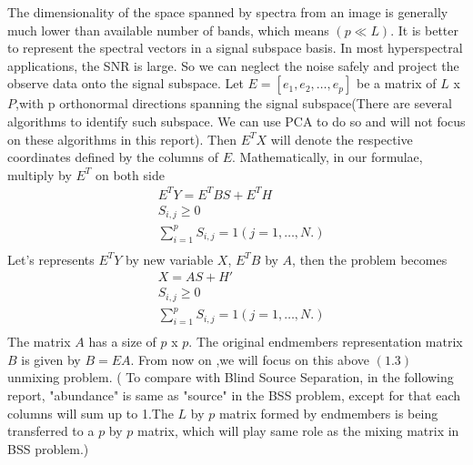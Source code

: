 \documentclass[14pt]{book}
\begin{document}
 The dimensionality of the space spanned by spectra from an image is generally much lower than available number of bands, which means $(p\ll L)$. It is better to represent the spectral vectors in a signal subspace basis. In most hyperspectral applications, the SNR is large. So we can neglect the noise safely and project the observe data onto the signal subspace. Let $E = [e_1,e_2, \dots, e_p]$ be a matrix of $L$ x $P$,with p orthonormal directions spanning the signal subspace(There are several algorithms to identify such subspace. We can use PCA to do so and will not focus on these algorithms in this report). Then $E^TX $ will denote the respective coordinates defined by the columns of $E$. Mathematically, in our formulae, multiply by $E^T$ on both side
\begin{equation}
\begin{aligned}
& E^TY = E^TBS+E^TH\\
& S_{i,j}\geq 0\\
& \sum_{i=1}^p S_{i,j} =1 (j=1, \ldots, N.)\\
\end{aligned}
\end{equation}
Let's represents $E^TY$ by new variable  $X$, $E^TB$ by $A$, then the problem becomes 
\begin{equation}
\begin{aligned}
& X = AS+H'\\
& S_{i,j}\geq 0\\
& \sum_{i=1}^p S_{i,j} =1 (j=1, \ldots, N.)\\
\end{aligned}
\end{equation}
The matrix $A$ has a size of $p$ x $p$. The original endmembers representation matrix $B$ is given by $B=EA$.
From now on ,we will focus on this above $(1.3)$ unmixing problem. ( To compare with Blind Source Separation, in the following report, "abundance" is same as "source" in the BSS problem, except for that each columns will sum up to 1.The $L$ by $p$ matrix formed by endmembers is being transferred to a $p$ by $p$ matrix, which will play same role as the mixing matrix in BSS problem.)
\end{document}
